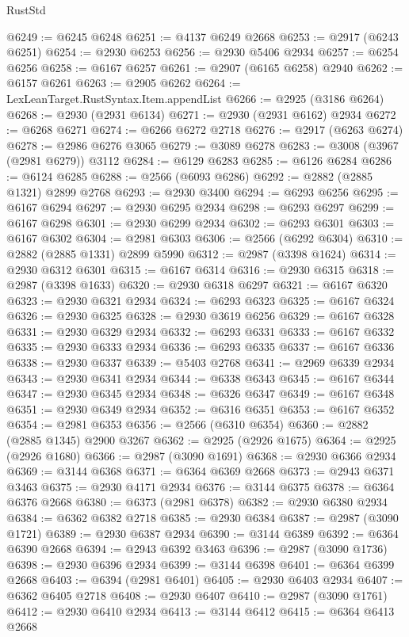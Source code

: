 \begin{lexlean}{RustStd}
\begin{coremodule}
@6249 := @6245 @6248
@6251 := @4137 @6249 @2668
@6253 := @2917 (@6243 @6251)
@6254 := @2930 @6253
@6256 := @2930 @5406 @2934
@6257 := @6254 @6256
@6258 := @6167 @6257
@6261 := @2907 (@6165 @6258) @2940
@6262 := @6157 @6261
@6263 := @2905 @6262
@6264 := LexLeanTarget.RustSyntax.Item.appendList
@6266 := @2925 (@3186 @6264)
@6268 := @2930 (@2931 @6134)
@6271 := @2930 (@2931 @6162) @2934
@6272 := @6268 @6271
@6274 := @6266 @6272 @2718
@6276 := @2917 (@6263 @6274)
@6278 := @2986 @6276 @3065
@6279 := @3089 @6278
@6283 := @3008 (@3967 (@2981 @6279)) @3112
@6284 := @6129 @6283
@6285 := @6126 @6284
@6286 := @6124 @6285
@6288 := @2566 (@6093 @6286)
@6292 := @2882 (@2885 @1321) @2899 @2768
@6293 := @2930 @3400
@6294 := @6293 @6256
@6295 := @6167 @6294
@6297 := @2930 @6295 @2934
@6298 := @6293 @6297
@6299 := @6167 @6298
@6301 := @2930 @6299 @2934
@6302 := @6293 @6301
@6303 := @6167 @6302
@6304 := @2981 @6303
@6306 := @2566 (@6292 @6304)
@6310 := @2882 (@2885 @1331) @2899 @5990
@6312 := @2987 (@3398 @1624)
@6314 := @2930 @6312 @6301
@6315 := @6167 @6314
@6316 := @2930 @6315
@6318 := @2987 (@3398 @1633)
@6320 := @2930 @6318 @6297
@6321 := @6167 @6320
@6323 := @2930 @6321 @2934
@6324 := @6293 @6323
@6325 := @6167 @6324
@6326 := @2930 @6325
@6328 := @2930 @3619 @6256
@6329 := @6167 @6328
@6331 := @2930 @6329 @2934
@6332 := @6293 @6331
@6333 := @6167 @6332
@6335 := @2930 @6333 @2934
@6336 := @6293 @6335
@6337 := @6167 @6336
@6338 := @2930 @6337
@6339 := @5403 @2768
@6341 := @2969 @6339 @2934
@6343 := @2930 @6341 @2934
@6344 := @6338 @6343
@6345 := @6167 @6344
@6347 := @2930 @6345 @2934
@6348 := @6326 @6347
@6349 := @6167 @6348
@6351 := @2930 @6349 @2934
@6352 := @6316 @6351
@6353 := @6167 @6352
@6354 := @2981 @6353
@6356 := @2566 (@6310 @6354)
@6360 := @2882 (@2885 @1345) @2900 @3267
@6362 := @2925 (@2926 @1675)
@6364 := @2925 (@2926 @1680)
@6366 := @2987 (@3090 @1691)
@6368 := @2930 @6366 @2934
@6369 := @3144 @6368
@6371 := @6364 @6369 @2668
@6373 := @2943 @6371 @3463
@6375 := @2930 @4171 @2934
@6376 := @3144 @6375
@6378 := @6364 @6376 @2668
@6380 := @6373 (@2981 @6378)
@6382 := @2930 @6380 @2934
@6384 := @6362 @6382 @2718
@6385 := @2930 @6384
@6387 := @2987 (@3090 @1721)
@6389 := @2930 @6387 @2934
@6390 := @3144 @6389
@6392 := @6364 @6390 @2668
@6394 := @2943 @6392 @3463
@6396 := @2987 (@3090 @1736)
@6398 := @2930 @6396 @2934
@6399 := @3144 @6398
@6401 := @6364 @6399 @2668
@6403 := @6394 (@2981 @6401)
@6405 := @2930 @6403 @2934
@6407 := @6362 @6405 @2718
@6408 := @2930 @6407
@6410 := @2987 (@3090 @1761)
@6412 := @2930 @6410 @2934
@6413 := @3144 @6412
@6415 := @6364 @6413 @2668

\end{coremodule}
\end{lexlean}

